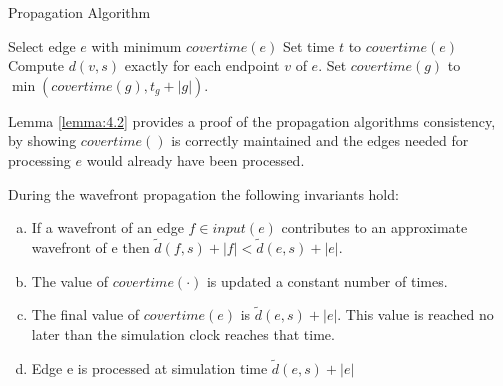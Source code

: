 \begin{algorithm}[H]
	\caption{Propagation Algorithm} \label{algorithm:propagationalgorithm}
    \setcounter{algorithm}{10}
	\begin{algorithmic}[1]
        	\State Select edge $e$ with minimum $covertime(e)$
            \State Set time $t$ to $covertime(e)$
            \State {}
            \State Compute $d(v,s)$ exactly for each endpoint $v$ of $e$.
           		\State {}
                \State Set $covertime(g)$ to $\min(covertime(g), t_g + |g|)$.
            \EndFor
        \EndWhile
	\end{algorithmic} 
\end{algorithm}

Lemma \ref{lemma:4.2} provides a proof of the propagation algorithms consistency, by showing 
$covertime()$ is correctly maintained and the edges needed for processing $e$ would already have 
been processed. 

\begin{Lemma}\label{lemma:4.2}
During the wavefront propagation the following invariants hold:

\begin{enumerate}[(a)]
	\item If a wavefront of an edge $f \in input(e)$ contributes to an
	approximate wavefront of e then $\tilde{d}(f,s)+|f|<\tilde{d}(e,s)+|e|$.
	\item The value of $covertime(\cdot)$ is updated a constant number of times.
	\item The final value of $covertime(e)$ is $\tilde{d}(e,s)+|e|$. This value
	is reached no later than the simulation clock reaches that time.
	\item Edge e is processed at simulation time $\tilde{d}(e,s) + |e|$
	\end{enumerate}
\end{Lemma}

